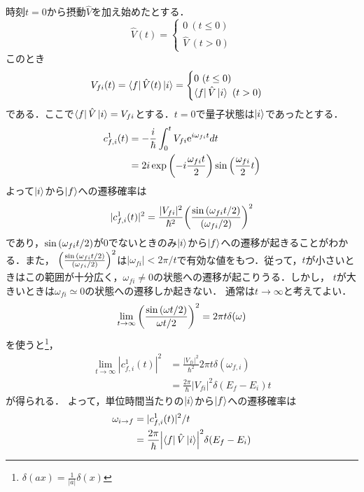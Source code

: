 \documentclass{standalone}
\begin{document}
  時刻$t=0$から摂動$\hat{V}$を加え始めたとする．
  \begin{equation}
    \hat{V}(t)=
    \begin{cases}
      0\ (t\le0)\\
      \hat{V}\ (t>0)
    \end{cases}
  \end{equation}
  このとき
  \begin{equation}
    V_{fi}(t)=\bra{f}\hat{V}(t)\ket{i}=
    \begin{cases}
      0\ (t\le 0)\\
      \bra{f}\hat{V}\ket{i}\ (t>0)
    \end{cases}
  \end{equation}
  である．ここで$\bra{f}\hat{V}\ket{i}=V_{fi}$とする．$t=0$で量子状態は$\ket{i}$であったとする．
  \begin{align}
    c_{f,i}^1(t)&=-\frac{i}{\hbar}\int_{0}^{t}V_{fi}\mathrm{e}^{i\omega_{fi}t}dt\\
    &=2i\exp\qty(-i\frac{\omega_{fi}t}{2})\sin\qty(\frac{\omega_{fi}}{2}t)
  \end{align}
  よって$\ket{i}$から$\ket{f}$への遷移確率は
  \begin{equation}
    |c_{f,i}^1(t)|^2=\frac{|V_{fi}|^2}{\hbar^2}\qty(\frac{\sin\qty(\omega_{fi}t/2)}{\qty(\omega_{fi}/2)})^2
  \end{equation}
  であり，$\sin\qty(\omega_{fi}t/2)$が0でないときのみ$\ket{i}$から$\ket{f}$への遷移が起きることがわかる．また，
  $\qty(\frac{\sin\qty(\omega_{fi}t/2)}{\qty(\omega_{fi}/2)})^2$は$|\omega_{fi}|<2\pi/t$で有効な値をもつ．従って，$t$が小さいときはこの範囲が十分広く，$\omega_{fi}\ne0$の状態への遷移が起こりうる．しかし，
  $t$が大きいときは$\omega_{fi}\simeq0$の状態への遷移しか起きない．
  通常は$t\to\infty$と考えてよい．
  \begin{equation}
    \lim_{t\to\infty}\qty(\frac{\sin\qty(\omega t/2)}{\omega t/2})^2=2\pi t\delta(\omega)
  \end{equation}
  を使うと\footnote{$\delta(ax)=\frac{1}{|a|}\delta(x)$}，
  \begin{align}
    \lim_{t\to\infty}|c_{f,i}^1(t)|^2&=\frac{|V_{fi}|^2}{\hbar^2}2\pi t\delta(\omega_{f,i})\\
    &=\frac{2\pi}{\hbar}|V_{fi}|^2\delta(E_f-E_i)t
  \end{align}
  が得られる．
  よって，単位時間当たりの$\ket{i}$から$\ket{f}$への遷移確率は
  \begin{align}
    \omega_{i\to f}&=|c_{f,i}^1(t)|^2/t\\
    &=\frac{2\pi}{\hbar}\qty|\bra{f}\hat{V}\ket{i}|^2\delta(E_f-E_i)
  \end{align}
\end{document}
